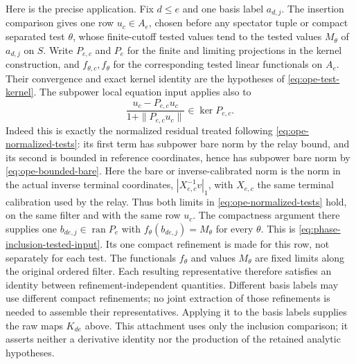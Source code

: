 Here is the precise application. Fix $d\le e$ and one basis label
$a_{d,j}$. The insertion comparison gives one row $u_c\in A_e$, chosen
before any spectator tuple or compact separated test $\theta$, whose
finite-cutoff tested values tend to the tested values $M_\theta$ of
$a_{d,j}$ on $S$. Write $P_{e,c}$ and $P_e$ for the finite and limiting
projections in the kernel construction, and $f_{\theta,c},f_\theta$ for
the corresponding tested linear functionals on $A_e$. Their convergence
and exact kernel identity are the hypotheses of
\eqref{eq:ope-test-kernel}. The subpower local equation input applies
also to
\[
 \frac{u_c-P_{e,c}u_c}{1+\|P_{e,c}u_c\|}\in\ker P_{e,c}.
\]
Indeed this is exactly the normalized residual treated following
\eqref{eq:ope-normalized-tests}: its first term has subpower bare norm
by the relay bound, and its second is bounded in reference coordinates,
hence has subpower bare norm by \eqref{eq:ope-bounded-bare}. Here the bare
or inverse-calibrated norm is the norm in the actual inverse terminal
coordinates, $|X_{e,c}^{-1}v|_1$, with $X_{e,c}$ the same terminal
calibration used by the relay. Thus both
limits in \eqref{eq:ope-normalized-tests} hold, on the same filter and
with the same row $u_c$. The compactness argument there supplies one
$b_{de,j}\in\operatorname{ran}P_e$ with
$f_\theta(b_{de,j})=M_\theta$ for every $\theta$. This is
\eqref{eq:phase-inclusion-tested-input}. Its one compact refinement is
made for this row, not separately for each test. The functionals
$f_\theta$ and values $M_\theta$ are fixed limits along the original
ordered filter. Each resulting representative therefore satisfies an
identity between refinement-independent quantities. Different basis labels
may use different compact refinements; no joint extraction of those
refinements is needed to assemble their representatives. Applying it to the basis
labels supplies the raw maps $K_{de}$ above. This attachment uses only the
inclusion comparison; it asserts neither a derivative identity nor the
production of the retained analytic hypotheses.

